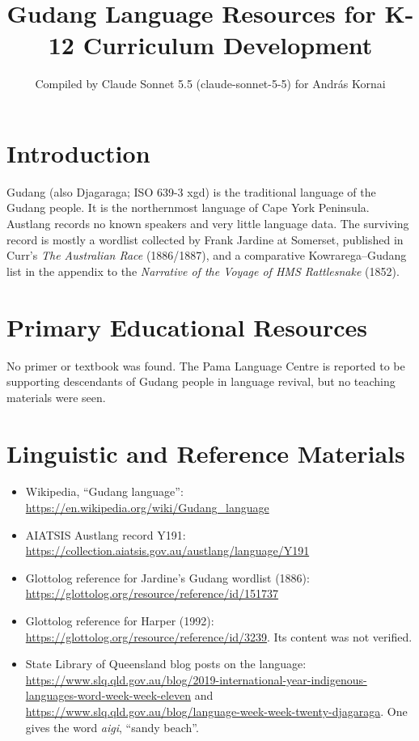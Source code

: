 \documentclass[12pt]{article}
\title{Gudang Language Resources for K-12 Curriculum Development}
\author{Compiled by Claude Sonnet 5.5 (claude-sonnet-5-5) for Andr\'as Kornai}
\date{}
\begin{document}
\maketitle

\section{Introduction}
Gudang (also Djagaraga; ISO 639-3 xgd) is the traditional language of the Gudang people. It is the northernmost language of Cape York Peninsula. Austlang records no known speakers and very little language data. The surviving record is mostly a wordlist collected by Frank Jardine at Somerset, published in Curr's \emph{The Australian Race} (1886/1887), and a comparative Kowrarega--Gudang list in the appendix to the \emph{Narrative of the Voyage of HMS Rattlesnake} (1852).

\section{Primary Educational Resources}
No primer or textbook was found. The Pama Language Centre is reported to be supporting descendants of Gudang people in language revival, but no teaching materials were seen.

\section{Linguistic and Reference Materials}
\begin{itemize}
\item Wikipedia, ``Gudang language'': \url{https://en.wikipedia.org/wiki/Gudang_language}
\item AIATSIS Austlang record Y191: \url{https://collection.aiatsis.gov.au/austlang/language/Y191}
\item Glottolog reference for Jardine's Gudang wordlist (1886): \url{https://glottolog.org/resource/reference/id/151737}
\item Glottolog reference for Harper (1992): \url{https://glottolog.org/resource/reference/id/3239}. Its content was not verified.
\item State Library of Queensland blog posts on the language: \url{https://www.slq.qld.gov.au/blog/2019-international-year-indigenous-languages-word-week-week-eleven} and \url{https://www.slq.qld.gov.au/blog/language-week-week-twenty-djagaraga}. One gives the word \emph{aigi}, ``sandy beach''.
\end{itemize}
\end{document}
